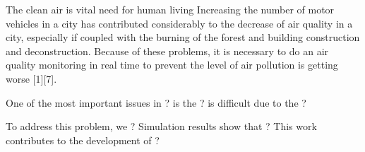 
The clean air is vital need for human living
Increasing the number of motor vehicles in a city has contributed considerably to the decrease of air quality in a city,
	especially if coupled with the burning of the forest and building construction and deconstruction.
Because of these problems,
	it is necessary to do an air quality monitoring in real time to prevent the level of air pollution is getting worse [1][7].


One of the most important issues in ? is the 
 ? is difficult due to the ?

To address this problem, we ?
Simulation results show that ?
This work contributes to the development of ?

